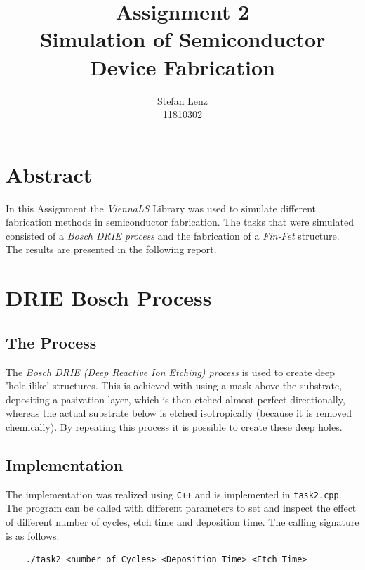 \documentclass[12pt,a4paper]{article}
\title{Assignment 2\\Simulation of Semiconductor Device Fabrication}
\author{Stefan Lenz\\11810302}
\date{}
\begin{document}
\maketitle
\newpage
\tableofcontents
\newpage
\section{Abstract}
In this Assignment the \textit{ViennaLS} Library was used to simulate different fabrication methods in semiconductor fabrication. The tasks that were simulated consisted of a \textit{Bosch DRIE process} and the fabrication of a \textit{Fin-Fet} structure. The results are presented in the following report.
\section{DRIE Bosch Process}
\subsection{The Process}
The \textit{Bosch DRIE (Deep Reactive Ion Etching) process} is used to create deep 'hole-ilike' structures. This is achieved with using a mask above the substrate, depositing a pasivation layer, which is then etched almost perfect directionally, whereas the actual substrate below is etched isotropically (because it is removed chemically). By repeating this process it is possible to create these deep holes.
\subsection{Implementation}
The implementation was realized using \lstinline{C++} and is implemented in \lstinline{task2.cpp}. The program can be called with different parameters to set and inspect the effect of different number of cycles, etch time and deposition time. The calling signature is as follows:
\begin{verbatim}
    ./task2 <number of Cycles> <Deposition Time> <Etch Time>
\end{verbatim}
\end{document}
